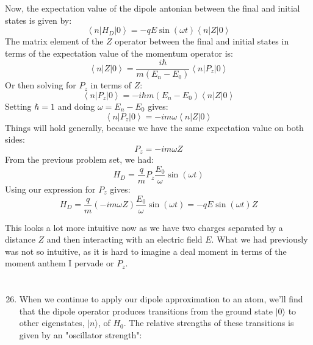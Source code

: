 \documentclass[12pt]{article}
\begin{document}
Now, the expectation value of the dipole antonian between the final and initial states is given by:
\begin{equation}
  \left\langle n\left|H_{D}\right| 0\right\rangle = -qE\sin(\omega t)\left\langle n\left|Z\right| 0\right\rangle
\end{equation}
The matrix element of the $Z$ operator between the final and initial states in terms of the expectation value of the momentum operator is:
\begin{equation}
  \left\langle n\left|Z\right| 0\right\rangle = \frac{i\hbar}{m(E_n-E_0)}\left\langle n\left|P_{z}\right| 0\right\rangle
\end{equation}
Or then solving for $P_z$ in terms of $Z$:
\begin{equation}
  \left\langle n\left|P_{z}\right| 0\right\rangle = -i\hbar m(E_n-E_0)\left\langle n\left|Z\right| 0\right\rangle
\end{equation}
Setting $\hbar = 1$ and doing $\omega = E_n-E_0$ gives:
\begin{equation}
  \left\langle n\left|P_{z}\right| 0\right\rangle = -i m\omega \left\langle n\left|Z\right| 0\right\rangle
\end{equation}
Things will hold generally, because we have the same expectation value on both sides:
\begin{equation}
  P_{z}=-i m\omega Z
\end{equation}
From the previous problem set, we had:
\begin{equation}
  H_D = \frac{q }{m}P_z \frac{E_0}{\omega} \sin(\omega t)
\end{equation}
Using our expression for $P_z$ gives:
\begin{equation}
  H_D = \frac{q}{m}\left(-i m\omega Z\right) \frac{E_0}{\omega} \sin(\omega t) = -qE\sin(\omega t)Z
\end{equation}

This looks a lot more intuitive now as we have two charges separated by a distance $Z$ and then interacting with an electric field $E$. What we had previously was not so intuitive, as it is hard to imagine a deal moment in terms of the moment anthem I pervade or $P_z$.
\section{}
\begin{enumerate}
  \setcounter{enumi}{25}
  \item When we continue to apply our dipole approximation to an atom, we'll find that the dipole operator produces transitions from the ground state $|0\rangle$ to other eigenstates, $|n\rangle$, of $H_{0}$. The relative strengths of these transitions is given by an "oscillator strength":
\end{enumerate}
\end{document}
